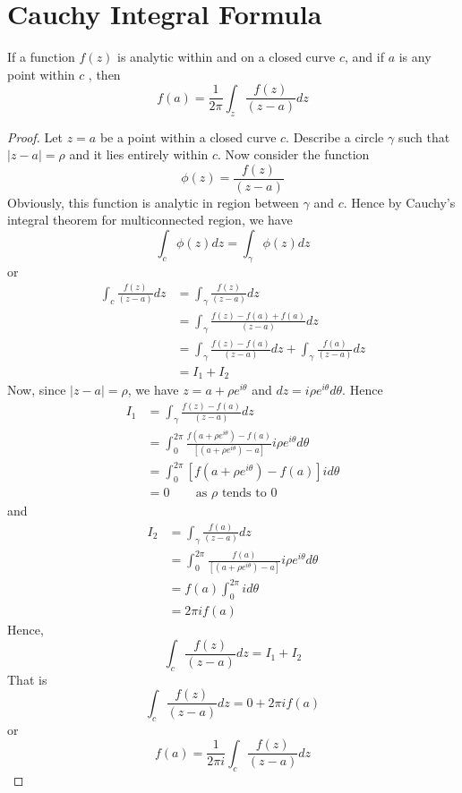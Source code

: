 \section{Cauchy Integral Formula}
\begin{thm}
If a function $f(z)$ is analytic within and on a closed curve $c$, and if $a$ is any point within $c$ , then
\[f(a) = \frac{1}{2\pi}\int_{z} \frac{f(z)}{(z-a)} dz\]
\end{thm}
\begin{proof}
Let $z=a$ be a point within a closed curve $c$. Describe a circle $\gamma$ such that $|z-a|=\rho$ and it lies entirely within $c$. Now consider the function 
\[\phi(z) = \frac{f(z)}{(z-a)}\]
Obviously, this function is analytic in region between $\gamma$ and $c$. Hence by Cauchy's integral theorem for multiconnected region, we have
\[\int_{c} \phi(z) dz = \int_{\gamma} \phi(z) dz\]
or
\begin{align*}
	\int_{c} \frac{f(z)}{(z-a)} dz 	&= \int_{\gamma} \frac{f(z)}{(z-a)} dz \\
																	&= \int_{\gamma} \frac{f(z) - f(a) + f(a)}{(z-a)} dz \\
																	&= \int_{\gamma} \frac{f(z) - f(a)}{(z-a)} dz + \int_{\gamma} \frac{f(a)}{(z-a)} dz \\
																	&= I_1 + I_2
\end{align*}
Now, since $|z-a|=\rho$, we have $z=a+ \rho e^{i\theta}$ and $dz = i \rho e^{i\theta} d\theta$. Hence
\begin{align*}
 I_1 &= \int_{\gamma} \frac{f(z) - f(a)}{(z-a)} dz \\
 	 &= \int_{0}^{2\pi} \frac{f(a+ \rho e^{i\theta}) - f(a)}{[(a+ \rho e^{i\theta})-a]} i \rho e^{i\theta} d\theta \\
 	 &= \int_{0}^{2\pi} [f(a+ \rho e^{i\theta}) - f(a)] i d\theta \\
 	 &=0 ~~~~~~~~\text{ as } \rho \text{ tends to 0}
\end{align*}
and
\begin{align*}
 I_2 &= \int_{\gamma} \frac{f(a)}{(z-a)} dz \\
 	 &= \int_{0}^{2\pi} \frac{f(a)}{[(a+ \rho e^{i\theta})-a]} i \rho e^{i\theta} d\theta \\
 	 &= f(a) \int_{0}^{2\pi} i d\theta \\
 	 &= 2\pi i f(a)	 
 \end{align*}
Hence,
\[\int_{c} \frac{f(z)}{(z-a)} dz = I_1 + I_2\]
That is 
\[\int_{c} \frac{f(z)}{(z-a)} dz = 0 + 2 \pi i f(a) \]
or
\[ f(a) = \frac{1}{2 \pi i}\int_{c} \frac{f(z)}{(z-a)} dz \]
\end{proof}
